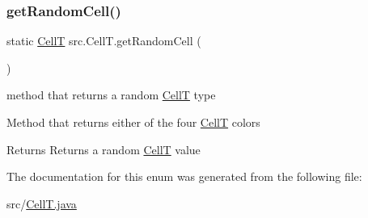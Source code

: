 \subsubsection{\texorpdfstring{get\+Random\+Cell()}{getRandomCell()}}
{\footnotesize\ttfamily static \hyperlink{enumsrc_1_1CellT}{CellT} src.\+Cell\+T.\+get\+Random\+Cell (\begin{DoxyParamCaption}{ }\end{DoxyParamCaption})\hspace{0.3cm}{\ttfamily [static]}}



method that returns a random \hyperlink{enumsrc_1_1CellT}{CellT} type 

Method that returns either of the four \hyperlink{enumsrc_1_1CellT}{CellT} colors \begin{DoxyReturn}{Returns}
Returns a random \hyperlink{enumsrc_1_1CellT}{CellT} value 
\end{DoxyReturn}


The documentation for this enum was generated from the following file\+:\begin{DoxyCompactItemize}
\item 
src/\hyperlink{CellT_8java}{Cell\+T.\+java}\end{DoxyCompactItemize}
